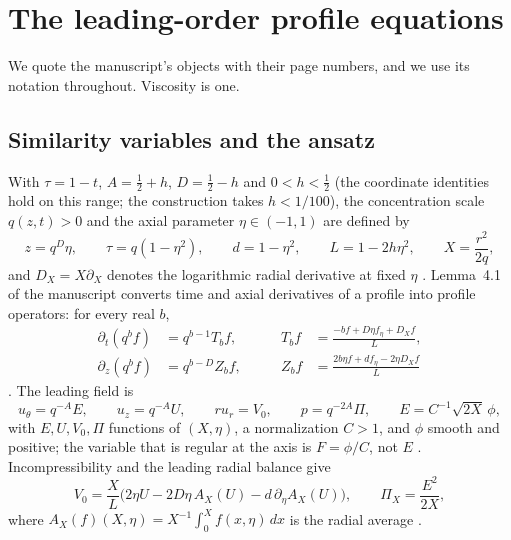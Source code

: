 \documentclass[11pt]{article}
\newcommand{\DX}{D_X}
\newcommand{\AX}{A_X}
\begin{document}
\section{The leading-order profile equations}\label{sec:setting}

We quote the manuscript's objects with their page numbers, and we use its notation throughout. Viscosity is one.

\subsection{Similarity variables and the ansatz}
With $\tau=1-t$, $A=\tfrac12+h$, $D=\tfrac12-h$ and $0<h<\tfrac12$ (the coordinate identities hold on this range; the construction takes $h<1/100$), the concentration scale $q(z,t)>0$ and the axial parameter $\eta\in(-1,1)$ are defined by
\begin{equation}\label{eq:sim}
z=q^D\eta,\qquad \tau=q(1-\eta^2),\qquad d=1-\eta^2,\qquad L=1-2h\eta^2,\qquad X=\frac{r^2}{2q},
\end{equation}
and $\DX=X\partial_X$ denotes the logarithmic radial derivative at fixed $\eta$ \cite[(4.1), p.~24; p.~25]{OpenAINS}. Lemma~4.1 of the manuscript converts time and axial derivatives of a profile into profile operators: for every real $b$,
\begin{equation}\label{eq:lemma41}
\begin{aligned}
\partial_t(q^bf)&=q^{b-1}T_bf,&\qquad T_bf&=\frac{-bf+D\eta f_\eta+\DX f}{L},\\
\partial_z(q^bf)&=q^{b-D}Z_bf,&\qquad Z_bf&=\frac{2b\eta f+df_\eta-2\eta\DX f}{L}
\end{aligned}
\end{equation}
\cite[(4.2), p.~25]{OpenAINS}. The leading field is
\begin{equation}\label{eq:ansatz}
u_\theta=q^{-A}E,\qquad u_z=q^{-A}U,\qquad ru_r=V_0,\qquad p=q^{-2A}\Pi,\qquad E=C^{-1}\sqrt{2X}\,\phi,
\end{equation}
with $E,U,V_0,\Pi$ functions of $(X,\eta)$, a normalization $C>1$, and $\phi$ smooth and positive; the variable that is regular at the axis is $F=\phi/C$, not $E$ \cite[(4.3)--(4.4), p.~25; p.~26]{OpenAINS}. Incompressibility and the leading radial balance give
\begin{equation}\label{eq:47}
V_0=\frac{X}{L}\bigl(2\eta U-2D\eta\,\AX(U)-d\,\partial_\eta\AX(U)\bigr),\qquad \Pi_X=\frac{E^2}{2X},
\end{equation}
where $\AX(f)(X,\eta)=X^{-1}\int_0^Xf(x,\eta)\,dx$ is the radial average \cite[(4.6), p.~25; (4.7), p.~26]{OpenAINS}.
\end{document}
